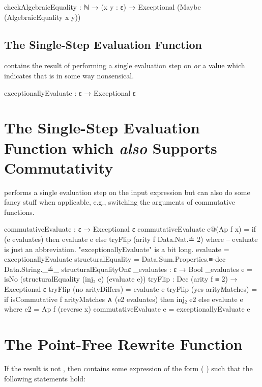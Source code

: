 \documentclass{report}
\begin{document}
\begin{code}
  checkAlgebraicEquality :
    ℕ → (x y : ε) → Exceptional (Maybe (AlgebraicEquality x y))
\end{code}

\subsection{The Single-Step Evaluation Function}
  contains the result of performing a single evaluation step on  \emph{or} a value which indicates that  is in some way nonsensical.

\begin{code}
  exceptionallyEvaluate : ε → Exceptional ε
\end{code}

\section{The Single-Step Evaluation Function which \emph{also} Supports Commutativity}
  performs a single evaluation step on the input expression but can also do some fancy stuff when applicable, e.g., switching the arguments of commutative functions.

\begin{code}
  commutativeEvaluate : ε → Exceptional ε
  commutativeEvaluate e@(Ap f x) =
    if (e evaluates) then evaluate e else tryFlip (arity f Data.Nat.≟ 2)
    where
    -- evaluate is just an abbreviation.  "exceptionallyEvaluate" is a bit long.
    evaluate = exceptionallyEvaluate
    structuralEquality =
      Data.Sum.Properties.≡-dec Data.String._≟_ structuralEqualityOnε
    _evaluates : ε → Bool
    _evaluates e = isNo (structuralEquality (inj₂ e) (evaluate e))
    tryFlip : Dec (arity f ≡ 2) → Exceptional ε
    tryFlip (no arityDiffers) = evaluate e
    tryFlip (yes arityMatches) =
      if isCommutative f arityMatches ∧ (e2 evaluates) then inj₂ e2 else evaluate e
      where e2 = Ap f (reverse x)
  commutativeEvaluate e = exceptionallyEvaluate e
\end{code}

\section{The Point-Free Rewrite Function}
If the result is not , then   contains some expression of the form  \AgdaSymbol(   \AgdaSymbol)  such that the following statements hold:
\end{document}
